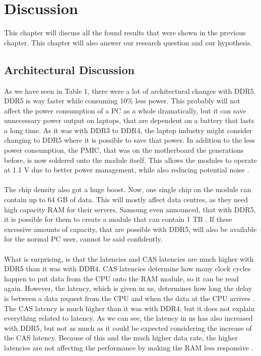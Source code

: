 \section{Discussion}

This chapter will discuss all the found results that were shown in the previous chapter. This chapter will also answer our research question and our hypothesis.

\subsection{Architectural Discussion}

As we have seen in Table 1, there were a lot of architectural changes with DDR5. DDR5 is way faster while consuming 10\% less power. This probably will not affect the power consumption of a PC as a whole dramatically, but it can save unnecessary power output on laptops, that are dependent on a battery that lasts a long time. As it was with DDR3 to DDR4, the laptop industry might consider changing to DDR5 where it is possible to save that power. In addition to the less power consumption, the PMIC, that was on the motherboard the generations before, is now soldered onto the module itself. This allows the modules to operate at 1.1 \gls{V} due to better power management, while also reducing potential noise \parencite{ddr5_overview_kingston}.
\\
\\
The chip density also got a huge boost. Now, one single chip on the module can contain up to 64 GB of data. This will mostly affect data centres, as they need high capacity RAM for their servers. Samsung even announced, that with DDR5, it is possible for them to create a module that can contain 1 \gls{TB} \parencite{samsung_1tb}. If these excessive amounts of capacity, that are possible with DDR5, will also be available for the normal PC user, cannot be said confidently.
\\
\\
What is surprising, is that the latencies and CAS latencies are much higher with DDR5 than it was with DDR4. CAS latencies determine how many clock cycles happen to put data from the CPU onto the RAM module, so it can be read again. However, the latency, which is given in \gls{ns}, determines how long the delay is between a data request from the CPU and when the data at the CPU arrives \parencite{DDR4_DDR5_CAS}. The CAS latency is much higher than it was with DDR4, but it does not explain everything related to latency. As we can see, the latency in ns has also increased with DDR5, but not as much as it could be expected considering the increase of the CAS latency. Because of this and the much higher data rate, the higher latencies are not affecting the performance by making the RAM less responsive \parencite{RAM_Latency}.
